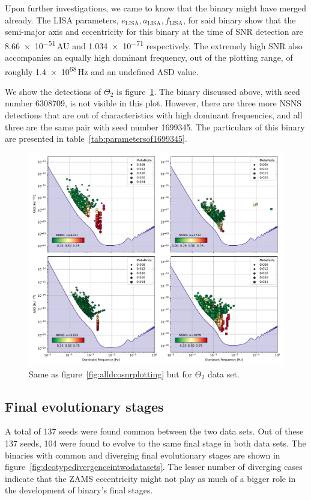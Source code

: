 \documentclass[twocolumn, twocolappendix]{aastex63}
\newcommand{\semaxis}[1]{a_{\text{#1}}}
\newcommand{\ecc}[1]{e_\text{#1}}
\begin{document}
    Upon further investigations, we came to know that the binary might have merged already.
    The LISA parameters, $\ecc{LISA}, \semaxis{LISA}, f_\text{LISA}$, for said binary show that the semi-major axis and eccentricity for this binary at the time of SNR detection are \num[scientific-notation=engineering]{8.66e-51}\,AU and \num[scientific-notation=engineering]{1.034e-71} respectively.
    The extremely high SNR also accompanies an equally high dominant frequency, out of the plotting range, of roughly \num{1.4e68}\,\si{\hertz} and an undefined ASD value.

    We show the detections of $\Theta_2$ is figure~\ref{fig:dcotypewisesnr0e}.
    The binary discussed above, with seed number 6308709, is not visible in this plot.
    However, there are three more NSNS detections that are out of characteristics with high dominant frequencies, and all three are the same pair with seed number 1699345.
    The particulars of this binary are presented in table~\ref{tab:parametersof1699345}.

    \begin{figure}[h]%
        \centering
        \includegraphics[width=\columnwidth]{analysis_data/004__images_for_latex/dco_typewise_snr0e}
        \caption{Same as figure~\ref{fig:alldcosnrplotting} but for $\Theta_2$ data set.}
        \label{fig:dcotypewisesnr0e}
    \end{figure}%

    \subsection{Final evolutionary stages}
    \label{subsec:finalevolutionarystages}
    A total of 137 seeds were found common between the two data sets.
    Out of these 137 seeds, 104 were found to evolve to the same final stage in both data sets.
    The binaries with common and diverging final evolutionary stages are shown in figure~\ref{fig:dcotypedivergenceintwodatasets}.
    The lesser number of diverging cases indicate that the ZAMS eccentricity might not play as much of a bigger role in the development of binary's final stages.
\end{document}
